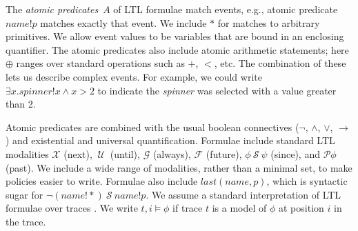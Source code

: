 \documentclass{llncs}
\newcommand{\sch}{\textit{name}}
\newcommand{\atom}{A}
\newcommand{\tr}{t\xspace}
\newcommand{\tnext}{\mathcal{X}}
\newcommand{\talways}{\mathcal{G}}
\newcommand{\tfuture}{\mathcal{F}}
\newcommand{\tuntil}{~\mathcal{U}~}
\newcommand{\tsince}{~\mathcal{S}~}
\newcommand{\tpast}{\mathcal{P}}
\newcommand{\tlast}[2]{\textit{last}(#1, #2)}
\newcommand{\limplies}{\rightarrow}
\begin{document}
The \emph{atomic predicates}~$A$ of LTL formulae match events,
e.g., atomic predicate $\sch!p$ matches exactly that event.
We include $\ast$ for matches to
arbitrary primitives. We allow event values to be
variables that are bound in an enclosing quantifier. The atomic
predicates also include atomic arithmetic
statements; here $\oplus$ ranges over standard operations such as $+$,
$<$, etc.  
The combination of these lets us describe complex
events. For example, we could write
$\exists x. \textit{spinner}!x \wedge x > 2$ to indicate the
\emph{spinner} was selected with a value greater than 2.

Atomic predicates are combined with the usual boolean connectives
($\neg$, $\wedge$, $\vee$, $\rightarrow$) and existential and
universal quantification.  Formulae include standard LTL
modalities $\tnext$ (next), $\tuntil$
(until), $\talways$ (always), $\tfuture$ (future), $\phi \tsince \psi$
(since), and $\tpast \phi$ (past). We include a wide range of
modalities, rather than a minimal set, to make policies easier to write.
Formulae also include
$\tlast{\sch}{p}$, which is syntactic sugar for $\lnot (\sch!\ast)
\tsince \sch!p$.
We assume a standard interpretation of LTL formulae over
traces \cite{Lichtenstein:85}.
We write $\tr, i \models \phi$ if trace $\tr$ is a model of $\phi$ at
position $i$ in the trace.

\end{document}
